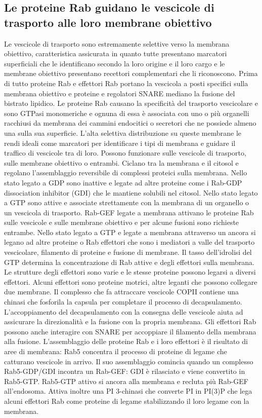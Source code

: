 \subsection{Le proteine Rab guidano le vescicole di trasporto alle loro membrane obiettivo}
Le vescicole di trasporto sono estremamente selettive verso la membrana obiettivo, caratteristica assicurata in quanto tutte presentano marcatori superficiali che le identificano 
secondo la loro origine e il loro cargo e le membrane obiettivo presentano recettori complementari che li riconoscono. Prima di tutto proteine Rab e effettori Rab portano la 
vescicola a posti specifici sulla membrana obiettivo e proteine e regolatori SNARE mediano la fusione del bistrato lipidico. Le proteine Rab causano la specificit\`a del trasporto
vescicolare e sono GTPasi monomeriche e ognuna di essa \`e associata con uno o pi\`u organelli racchiusi da membrana dei cammini endocitici o secretori che ne possiede almeno una sulla
sua superficie. L'alta selettiva distribuzione su queste membrane le rendi ideali come marcatori per identificare i tipi di membrana e guidare il traffico di vescicole tra di loro. 
Possono funzionare sulle vescicole di trasporto, sulle membrane obiettivo o entrambi. Ciclano tra la membrana e il citosol e regolano l'assemblaggio reversibile di complessi proteici
sulla membrana. Nello stato legato a GDP sono inattive e  legate ad altre proteine come i Rab-GDP dissociation inhibitor (GDI) che le mantiene solubili nel citosol. Nello stato legato
a GTP sono attive e associate strettamente con la membrana di un organello o un vescicola di trasporto. Rab-GEF legate a membrana attivano le proteine Rab sulle vescicole e sulle
membrane obiettivo e per alcune fusioni sono richieste entrambe. Nello stato legato a GTP e legate a membrana attraverso un ancora si legano ad altre proteine o Rab effettori che
sono i mediatori a valle del trasporto vescicolare, filamento di proteine e fusione di membrane. Il tasso dell'idrolisi del GTP determina la concentrazione di Rab attive e degli 
effettori sulla membrana. Le strutture degli effettori sono varie e le stesse proteine possono legarsi a diversi effettori. Alcuni effettori sono proteine motrici, altre leganti
che possono collegare due membrane. Il complesso che fa attraccare vescicole COPII contiene una chinasi che fosforila la capsula per completare il processo di decapsulamento. 
L'accoppiamento del decapsulamento con la consegna delle vescicole aiuta ad assicurare la direzionalit\`a e la fusione con la propria membrana. Gli effettori Rab possono anche 
interagire con SNARE per accoppiare il filamento della membrana alla fusione. L'assemblaggio delle proteine Rab e i loro effettori \`e il risultato di aree di membrana: Rab5 concentra il
processo di proteine di legame che catturano vescicole in arrivo. Il suo assemblaggio comincia quando un complesso Rab5-GDP/GDI incontra un Rab-GEF: GDI \`e rilasciato e viene convertito
in Rab5-GTP. Rab5-GTP attivo si ancora alla membrana e recluta pi\`u Rab-GEF all'endosoma. Attiva inoltre una PI 3-chinasi che converte PI in PI(3)P che lega alcuni effettori Rab come
proteine di legame stabilizzando il loro legame con la membrana.
